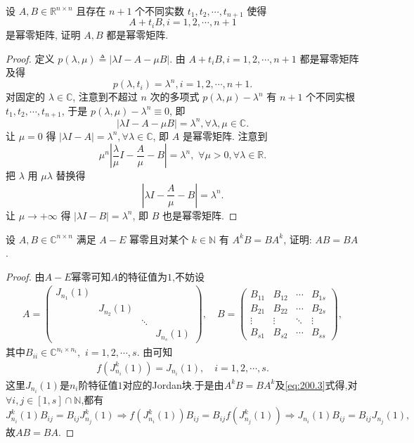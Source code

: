 \documentclass[../../main.tex]{subfiles}
\begin{document}
\begin{example}
设 \( A,B \in \mathbb{R}^{n \times n} \) 且存在 \( n+1 \) 个不同实数 \( t_1,t_2,\cdots,t_{n+1} \) 使得
\[
A + t_i B, i = 1,2,\cdots,n+1
\]
是幂零矩阵, 证明 \( A,B \) 都是幂零矩阵.
\end{example}
\begin{proof}
定义 \( p(\lambda,\mu) \triangleq |\lambda I - A - \mu B| \). 由 \( A + t_i B, i = 1,2,\cdots,n+1 \) 都是幂零矩阵及得
\[
p(\lambda,t_i) = \lambda^n, i = 1,2,\cdots,n+1.
\]
对固定的 \( \lambda \in \mathbb{C} \), 注意到不超过 \( n \) 次的多项式 \( p(\lambda,\mu)-\lambda^n \) 有 \( n+1 \) 个不同实根 \( t_1,t_2,\cdots,t_{n+1} \), 于是 \( p(\lambda,\mu)-\lambda^n \equiv 0 \), 即
\[
|\lambda I - A - \mu B| = \lambda^n, \forall \lambda, \mu \in \mathbb{C}.
\]
让 \( \mu = 0 \) 得 \( |\lambda I - A| = \lambda^n, \forall \lambda \in \mathbb{C} \), 即 \( A \) 是幂零矩阵. 注意到
\[
\mu^n \left| \frac{\lambda}{\mu} I - \frac{A}{\mu} - B \right| = \lambda^n,\,\, \forall \mu >0,\forall \lambda \in \mathbb{R}.
\]
把 \( \lambda \) 用 \( \mu\lambda \) 替换得
\[
\left| \lambda I - \frac{A}{\mu} - B \right| = \lambda^n.
\]
让 \( \mu \to +\infty \) 得 \( |\lambda I - B| = \lambda^n \), 即 \( B \) 也是幂零矩阵.
\end{proof}

\begin{example}
设 \( A,B \in \mathbb{C}^{n \times n} \) 满足 \( A - E \) 幂零且对某个 \( k \in \mathbb{N} \) 有 \( A^k B = BA^k \), 证明: \( AB = BA \).
\end{example}
\begin{proof}
由$A-E$幂零可知$A$的特征值为$1$,不妨设
\begin{align*}
A=\begin{pmatrix}
J_{n_1}(1)&&&\\
&J_{n_2}(1)&&\\
&&\ddots&\\
&&&J_{n_s}(1)
\end{pmatrix},\quad B=\begin{pmatrix}
B_{11}&B_{12}&\cdots&B_{1s}\\
B_{21}&B_{22}&\cdots&B_{2s}\\
\vdots&\vdots&\ddots&\vdots\\
B_{s1}&B_{s2}&\cdots&B_{ss}
\end{pmatrix},
\end{align*}
其中$B_{ii}\in \mathbb{C} ^{n_i\times n_i},\,\,i=1,2,\cdots ,s.$
由可知
\begin{align}
f\left( J_{n_i}^{k}(1) \right) =J_{n_i}(1),\quad i=1,2,\cdots ,s.
\label{eq:200.3}
\end{align}
这里$J_{n_i}(1)$是$n_i$阶特征值$1$对应的Jordan块.于是由$A^kB=BA^k$及\eqref{eq:200.3}式得,对$\forall i,j\in [1,s] \cap \mathbb{N}$,都有
\[
J_{n_i}^{k}(1) B_{ij}=B_{ij}J_{n_j}^{k}(1) \Longrightarrow f\left( J_{n_i}^{k}(1) \right) B_{ij}=B_{ij}f\left( J_{n_j}^{k}(1) \right) \Longrightarrow J_{n_i}(1) B_{ij}=B_{ij}J_{n_j}(1),
\]
故$AB=BA$.
\end{proof}
\end{document}
